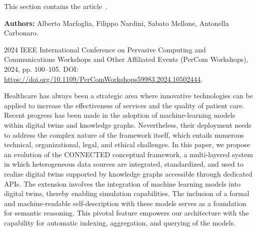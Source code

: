 
\noindent This section contains the article~\cite{marfoglia_2024_mimo}.

\begin{paperheader}
\textbf{Authors:} Alberto Marfoglia, Filippo Nardini, Sabato Mellone, Antonella Carbonaro.\par
2024 IEEE International Conference on Pervasive Computing and Communications Workshops and Other Affiliated Events (PerCom Workshops), 2024, pp. 100--105. DOI: \url{https://doi.org/10.1109/PerComWorkshops59983.2024.10502444}.
\end{paperheader}

\begin{paperabstract}

Healthcare has always been a strategic area where innovative technologies can be applied to increase the effectiveness of services and the quality of patient care. Recent progress has been made in the adoption of machine-learning models within digital twins and knowledge graphs. Nevertheless, their deployment needs to address the complex nature of the framework itself, which entails numerous technical, organizational, legal, and ethical challenges. In this paper, we propose an evolution of the CONNECTED conceptual framework, a multi-layered system in which heterogeneous data sources are integrated, standardized, and used to realize digital twins supported by knowledge graphs accessible through dedicated APIs. The extension involves the integration of machine learning models into digital twins, thereby enabling simulation capabilities. The inclusion of a formal and machine-readable self-description with these models serves as a foundation for semantic reasoning. This pivotal feature empowers our architecture with the capability for automatic indexing, aggregation, and querying of the models.
\end{paperabstract}

